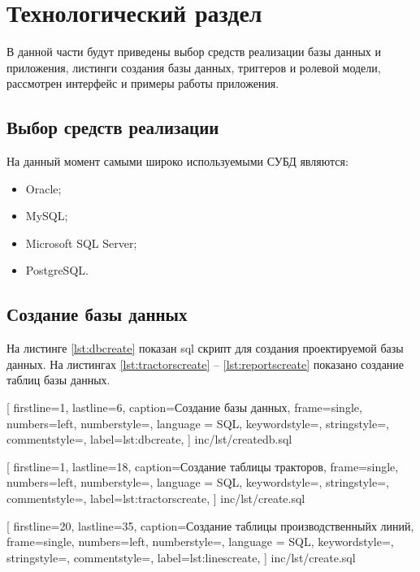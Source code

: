 \chapter{Технологический раздел}
В данной части будут приведены выбор средств реализации базы данных и приложения, листинги создания базы данных, триггеров и ролевой модели, рассмотрен интерфейс и примеры работы приложения.

\section{Выбор средств реализации}

На данный момент самыми широко используемыми СУБД являются\cite{DB-Engines}: 
\begin{itemize}[label=--]
    \item Oracle\cite{Oracle};
    \item MySQL\cite{MySQL};
    \item Microsoft SQL Server\cite{MicrosoftSQLServer};
    \item PostgreSQL\cite{PostgreSQL}.
\end{itemize}






\section{Создание базы данных}

На листинге \ref{lst:dbcreate} показан sql скрипт для создания проектируемой базы данных. На листингах \ref{lst:tractorscreate} -- \ref{lst:reportscreate} показано создание таблиц базы данных. 


[
    firstline=1,
    lastline=6,
    caption=Создание базы данных,
    frame=single,
    numbers=left,
	numberstyle=\footnotesize\color{numbers},
    language = SQL,
    keywordstyle=\color{keywords},
	stringstyle=\color{strings},
	commentstyle=\color{comments},
    label={lst:dbcreate},
]
{inc/lst/createdb.sql}



[
    firstline=1,
    lastline=18,
    caption=Создание таблицы тракторов,
    frame=single,
    numbers=left,
	numberstyle=\footnotesize\color{numbers},
    language = SQL,
    keywordstyle=\color{keywords},
	stringstyle=\color{strings},
	commentstyle=\color{comments},
    label={lst:tractorscreate},
]
{inc/lst/create.sql}


[
    firstline=20,
    lastline=35,
    caption=Создание таблицы производственныйх линий,
    frame=single,
    numbers=left,
	numberstyle=\footnotesize\color{numbers},
    language = SQL,
    keywordstyle=\color{keywords},
	stringstyle=\color{strings},
	commentstyle=\color{comments},
    label={lst:linescreate},
]
{inc/lst/create.sql}

